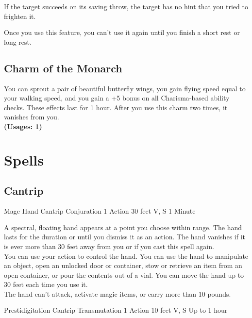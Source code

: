 \documentclass[letterpaper,openany,oneside,twocolumn]{book}
\begin{document}
If the target succeeds on its saving throw, the target has no hint that you tried to frighten it.

Once you use this feature, you can't use it again until you finish a short rest or long rest.
\subsection*{Charm of the Monarch}
You can sprout a pair of beautiful butterfly wings, you gain flying speed equal to your walking speed, and you gain a +5 bonus on all Charisma-based ability checks. These effects last for 1 hour. After you use this charm two times, it vanishes from you.\\
\textbf{(Usages: 1)}

\section*{Spells}
\subsection*{Cantrip}

\DndSpellHeader
  {Mage Hand}
  {Cantrip Conjuration}
  {1 Action}
  {30 feet}
  {V, S}
  {1 Minute}
  
A spectral, floating hand appears at a point you choose within range. The hand lasts for the duration or until you dismiss it as an action. The hand vanishes if it is ever more than 30 feet away from you or if you cast this spell again.\\
You can use your action to control the hand. You can use the hand to manipulate an object, open an unlocked door or container, stow or retrieve an item from an open container, or pour the contents out of a vial. You can move the hand up to 30 feet each time you use it.\\
The hand can’t attack, activate magic items, or carry more than 10 pounds.

\DndSpellHeader
  {Prestidigitation}
  {Cantrip Transmutation}
  {1 Action}
  {10 feet}
  {V, S}
  {Up to 1 hour}
\end{document}
